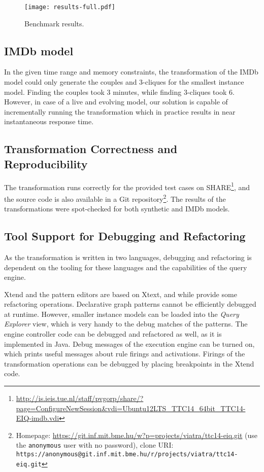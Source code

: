 \begin{figure}
	\centering
	\texttt{[image: results-full.pdf]}
	\caption{Benchmark results.}\label{fig:benchmark-results}
\end{figure}

\subsection{IMDb model}

In the given time range and memory constraints, the transformation of the IMDb model could only generate the couples and 3-cliques for the smallest instance model. Finding the couples took 3 minutes, while finding 3-cliques took 6. However, in case of a live and evolving model, our solution is capable of incrementally running the transformation which in practice results in near instantaneous response time.

\subsection{Transformation Correctness and Reproducibility}

The transformation runs correctly for the provided test cases on SHARE\footnote{\url{http://is.ieis.tue.nl/staff/pvgorp/share/?page=ConfigureNewSession&vdi=Ubuntu12LTS_TTC14_64bit_TTC14-EIQ-imdb.vdi}}, and the source code is also available in a Git repository\footnote{Homepage: \url{https://git.inf.mit.bme.hu/w?p=projects/viatra/ttc14-eiq.git} (use the \texttt{anonymous} user with no password), clone URI: \texttt{https://anonymous@git.inf.mit.bme.hu/r/projects/viatra/ttc14-eiq.git}}. The results of the transformations were spot-checked for both synthetic and IMDb models.  

\subsection{Tool Support for Debugging and Refactoring}

As the transformation is written in two languages, debugging and refactoring is dependent on the tooling for these languages and the capabilities of the query engine. 

Xtend and the \incquery{} pattern editors are based on Xtext, and while provide some refactoring operations. Declarative \incquery{} graph patterns cannot be efficiently debugged at runtime. However, smaller instance models can be loaded into the \emph{Query Explorer} view, which is very handy to the debug matches of the patterns. The engine controller code can be debugged and refactored as well, as it is implemented in Java. Debug messages of the execution engine can be turned on, which prints useful messages about rule firings and activations. Firings of the transformation operations can be debugged by placing breakpoints in the Xtend code.

